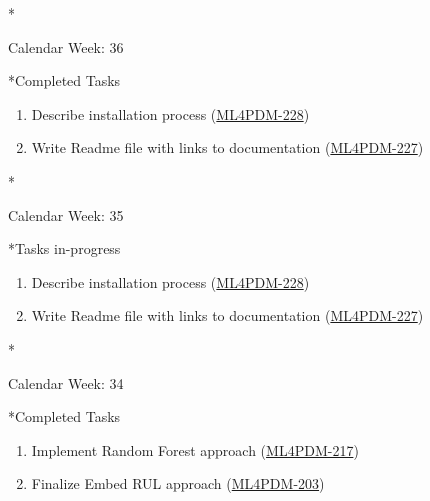 \documentclass[11pt,a4paper]{article}
\begin{document}
\newpage
\begin{section}*{Calendar Week: 36 \hfill \date{10 September, 2021}}
 \begin{refsection}
   \begin{subsection}*{Completed Tasks}
     \begin{enumerate}
       \item
             Describe installation process  (\href{https://ml4pdm.atlassian.net/browse/ML4PDM-228}{ML4PDM-228})
       \item
             Write Readme file with links to documentation (\href{https://ml4pdm.atlassian.net/browse/ML4PDM-227}{ML4PDM-227})
     \end{enumerate}
   \end{subsection}
 \end{refsection}
\end{section}

\newpage
\begin{section}*{Calendar Week: 35 \hfill \date{3 September, 2021}}
 \begin{refsection}
   \begin{subsection}*{Tasks in-progress}
     \begin{enumerate}
       \item
             Describe installation process  (\href{https://ml4pdm.atlassian.net/browse/ML4PDM-228}{ML4PDM-228})
       \item
             Write Readme file with links to documentation (\href{https://ml4pdm.atlassian.net/browse/ML4PDM-227}{ML4PDM-227})
     \end{enumerate}
   \end{subsection}
 \end{refsection}
\end{section}

\newpage
\begin{section}*{Calendar Week: 34 \hfill \date{27 August, 2021}}
 \begin{refsection}
   \begin{subsection}*{Completed Tasks}
     \begin{enumerate}
       \item
             Implement Random Forest approach  (\href{https://ml4pdm.atlassian.net/browse/ML4PDM-217}{ML4PDM-217})
       \item
             Finalize Embed RUL approach  (\href{https://ml4pdm.atlassian.net/browse/ML4PDM-203}{ML4PDM-203})
     \end{enumerate}
   \end{subsection}
 \end{refsection}
\end{section}
\end{document}
